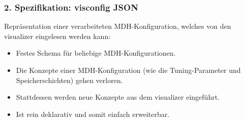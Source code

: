 \documentclass{presentation}
\begin{document}
\begin{frame}
	\frametitle{2. Spezifikation: visconfig JSON}
	Repräsentation einer verarbeiteten MDH-Konfiguration, welches von den visualizer eingelesen werden kann:
	\begin{itemize}
		\item Festes Schema für beliebige MDH-Konfigurationen.
		\item Die Konzepte einer MDH-Konfiguration (wie die Tuning-Parameter und Speicherschichten) gehen verloren.
		\item Stattdessen werden neue Konzepte aus dem visualizer eingeführt.
		\item Ist rein deklarativ und somit einfach erweiterbar.
	\end{itemize}
\end{frame}
\end{document}
